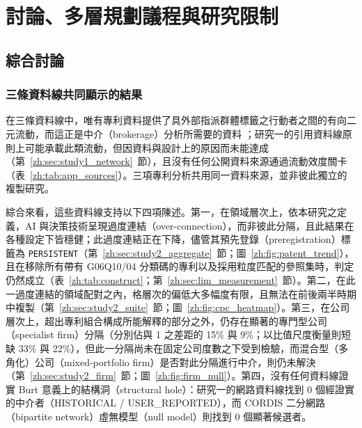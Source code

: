 
\chapter{討論、多層規劃議程與研究限制}
\label{zh:ch:discussion}

\section{綜合討論}
\label{zh:sec:discussion}

\subsection{三條資料線共同顯示的結果}
\label{zh:sec:discussion_lines}

在三條資料線中，唯有專利資料提供了具外部指派群體標籤之行動者之間的有向二元流動，而這正是中介（brokerage）分析所需要的資料 \citep{gould1989structures}；研究一的引用資料線原則上可能承載此類流動，但因資料與設計上的原因而未能達成（第~\ref{zh:sec:study1_network}~節），且沒有任何公開資料來源通過流動效度關卡（表~\ref{zh:tab:app_sources}）。三項專利分析共用同一資料來源，並非彼此獨立的複製研究。

綜合來看，這些資料線支持以下四項陳述。第一，在領域層次上，依本研究之定義，AI 與決策技術呈現過度連結（over-connection），而非彼此分隔，且此結果在各種設定下皆穩健；此過度連結正在下降，儘管其預先登錄（preregistration）標籤為 \texttt{PERSISTENT}（第~\ref{zh:sec:study2_aggregate}~節；圖~\ref{zh:fig:patent_trend}），且在移除所有帶有 G06Q10/04 分類碼的專利以及採用粒度匹配的參照集時，判定仍然成立（表~\ref{zh:tab:construct}；第~\ref{zh:sec:lim_measurement}~節）。第二，在此一過度連結的領域配對之內，格層次的偏低大多幅度有限，且無法在前後兩半時期中複製（第~\ref{zh:sec:study2_suite}~節；圖~\ref{zh:fig:cpc_heatmap}）。第三，在公司層次上，超出專利組合構成所能解釋的部分之外，仍存在顯著的專門型公司（specialist firm）分隔（分別佔與 1 之差距的 15\% 與 9\%；以比值尺度衡量則短缺 33\% 與 22\%），但此一分隔尚未在固定公司度數之下受到檢驗，而混合型（多角化）公司（mixed-portfolio firm）是否對此分隔進行中介，則仍未解決（第~\ref{zh:sec:study2_firm}~節；圖~\ref{zh:fig:firm_null}）。第四，沒有任何資料線證實 Burt 意義上的結構洞（structural hole）：研究一的網路資料線找到 0 個經證實的中介者（HISTORICAL / USER\_REPORTED），而 CORDIS 二分網路（bipartite network）虛無模型（null model）則找到 0 個顯著候選者。

